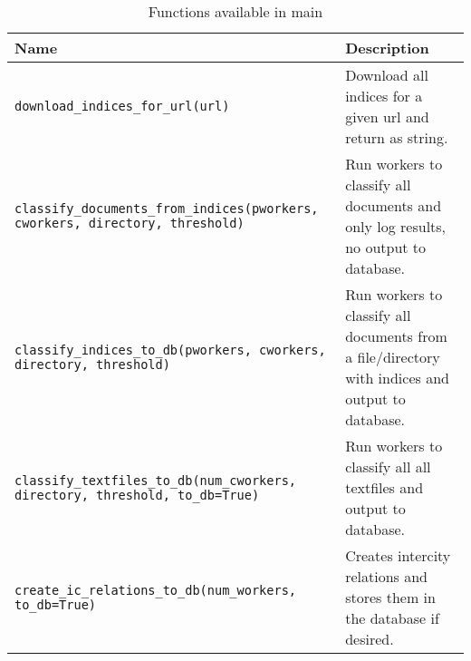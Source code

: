 \begin{table}[H]
\centering

\label{main-functions}
\begin{tabular}{m{8cm} p{8cm}}
\textbf{Name}                     & Description  \\\hline
\texttt{download\_indices\_for\_url(url)} & Download all indices for a given url and return as string. \\\hline

\texttt{classify\_documents\_from\_indices(pworkers, cworkers, directory, threshold)} & Run workers to classify all documents and only log results, no output to database.\\\hline

\texttt{classify\_indices\_to\_db(pworkers, cworkers, directory, threshold)} & Run workers to classify all documents from a file/directory with indices and output to database.\\\hline

\texttt{classify\_textfiles\_to\_db(num\_cworkers, directory, threshold, to\_db=True)} & Run workers to classify all all textfiles and output to database.\\\hline

\texttt{create\_ic\_relations\_to\_db(num\_workers, to\_db=True)} & Creates intercity relations and stores them in the database if desired. \\\hline 

\end{tabular}
\caption{Functions available in main}
\end{table}